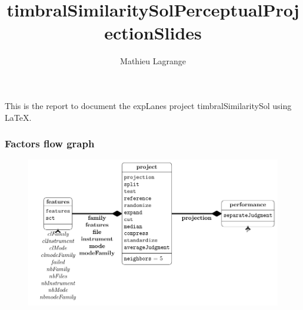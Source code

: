 \documentclass{beamer}
\title{timbralSimilaritySolPerceptualProjectionSlides}
\author{ Mathieu Lagrange }
\begin{document}
            
 
\maketitle            
 
 
This is the report to document the expLanes project timbralSimilaritySol using \LaTeX.            
 
 
 
 
 
\begin{frame}\frametitle{Factors flow graph}          
 
 
\begin{center}         
 
 
\begin{figure}        
 
 
\includegraphics[width=\textwidth,height=0.8\textheight,keepaspectratio]{../figures/factors.pdf}       
 
 
\label{factorFlowGraph}      
 
 
\end{figure}     
 
 
\end{center}    
 
 
\end{frame}   
 
\end{document}
